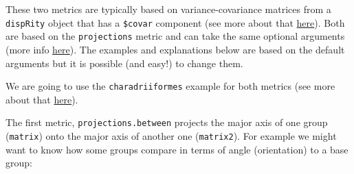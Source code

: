 \documentclass[
]{book}
\newenvironment{Shaded}{\begin{snugshade}}{\end{snugshade}}
\newcommand{\CommentTok}[1]{\textcolor[rgb]{0.56,0.35,0.01}{\textit{#1}}}
\newcommand{\DataTypeTok}[1]{\textcolor[rgb]{0.13,0.29,0.53}{#1}}
\newcommand{\DecValTok}[1]{\textcolor[rgb]{0.00,0.00,0.81}{#1}}
\newcommand{\KeywordTok}[1]{\textcolor[rgb]{0.13,0.29,0.53}{\textbf{#1}}}
\newcommand{\NormalTok}[1]{#1}
\newcommand{\OperatorTok}[1]{\textcolor[rgb]{0.81,0.36,0.00}{\textbf{#1}}}
\newcommand{\StringTok}[1]{\textcolor[rgb]{0.31,0.60,0.02}{#1}}
\begin{document}
These two metrics are typically based on variance-covariance matrices from a \texttt{dispRity} object that has a \texttt{\$covar} component (see more about that \protect\hyperlink{covar}{here}).
Both are based on the \texttt{projections} metric and can take the same optional arguments (more info \protect\hyperlink{projections}{here}).
The examples and explanations below are based on the default arguments but it is possible (and easy!) to change them.

We are going to use the \texttt{charadriiformes} example for both metrics (see more about that \protect\hyperlink{covar}{here}).

\begin{Shaded}
\end{Shaded}

The first metric, \texttt{projections.between} projects the major axis of one group (\texttt{matrix}) onto the major axis of another one (\texttt{matrix2}).
For example we might want to know how some groups compare in terms of angle (orientation) to a base group:
\end{document}
